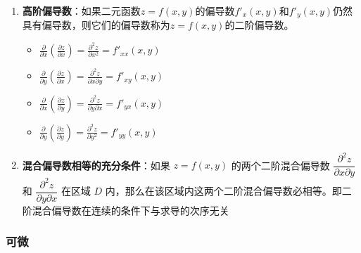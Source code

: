 \documentclass[../book.tex]{subfiles}
\begin{document}
\begin{enumerate}
        \item \textbf{高阶偏导数}：如果二元函数$z = f(x, y)$的偏导数$f'_x(x, y)$和$f'_y(x, y)$仍然具有偏导数，则它们的偏导数称为$z = f(x, y)$的二阶偏导数。
        \begin{itemize}
            \item $\displaystyle\frac{\partial}{\partial x}\left(\frac{\partial z}{\partial x}\right) = \frac{\partial^2 z}{\partial x^2} = f'_{xx}(x,y)$
            \item $\displaystyle\frac{\partial}{\partial y}\left(\frac{\partial z}{\partial x}\right) = \frac{\partial^2 z}{\partial x \partial y} = f'_{xy}(x,y)$
            \item $\displaystyle\frac{\partial}{\partial x}\left(\frac{\partial z}{\partial y}\right) = \frac{\partial^2 z}{\partial y \partial x} = f'_{yx}(x,y)$
            \item $\displaystyle\frac{\partial}{\partial y}\left(\frac{\partial z}{\partial y}\right) = \frac{\partial^2 z}{\partial y^2} = f'_{yy}(x,y)$
        \end{itemize}

        \item \textbf{混合偏导数相等的充分条件}：如果 $z = f(x,y)$ 的两个二阶混合偏导数 $\dfrac{\partial^2 z}{\partial x \partial y}$ 和 $\dfrac{\partial^2 z}{\partial y \partial x}$ 在区域 $D$ 内{\color{red}{连续}}，那么在该区域内这两个二阶混合偏导数必相等。即二阶混合偏导数在连续的条件下与求导的次序无关
    \end{enumerate}

    \subsubsection{可微}
\end{document}
